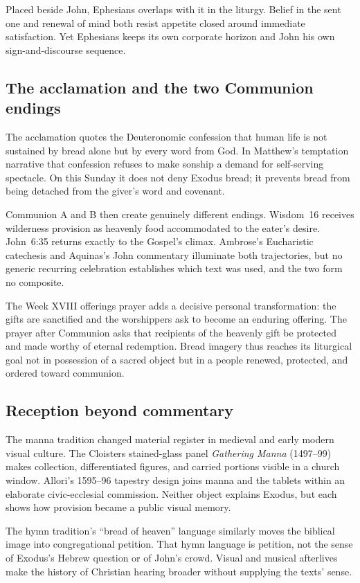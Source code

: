 Placed beside John, Ephesians overlaps with it in the liturgy. Belief in the sent one and renewal of mind both
resist appetite closed around immediate satisfaction. Yet Ephesians keeps its own corporate horizon and John his own sign-and-discourse sequence.

\subsection*{The acclamation and the two Communion endings}

The acclamation quotes the Deuteronomic confession that human life is not
sustained by bread alone but by every word from God. In Matthew's temptation
narrative that confession refuses to make sonship a demand for self-serving
spectacle. On this Sunday it does not deny Exodus bread; it prevents bread from
being detached from the giver's word and covenant.

Communion A and B then create genuinely different endings. Wisdom~16 receives
wilderness provision as heavenly food accommodated to the eater's desire.
John~6:35 returns exactly to the Gospel's climax. Ambrose's Eucharistic
catechesis and Aquinas's John commentary illuminate both trajectories, but no generic recurring celebration establishes which text was used, and the
two form no composite.

The Week XVIII offerings prayer adds a decisive personal transformation: the
gifts are sanctified and the worshippers ask to become an enduring offering.
The prayer after Communion asks that recipients of the heavenly gift be
protected and made worthy of eternal redemption. Bread imagery thus reaches
its liturgical goal not in possession of a sacred object but in a people
renewed, protected, and ordered toward communion.

\subsection*{Reception beyond commentary}

The manna tradition changed material register in medieval and early modern
visual culture. The Cloisters stained-glass panel \emph{Gathering Manna}
(1497--99) makes collection, differentiated figures, and carried portions
visible in a church window. Allori's 1595--96 tapestry design joins manna and
the tablets within an elaborate civic-ecclesial commission. Neither object
explains Exodus, but each shows how provision became a public visual memory.

The hymn tradition's ``bread of heaven'' language similarly moves the biblical
image into congregational petition. That hymn language is petition, not the sense of Exodus's Hebrew question or
of John's crowd. Visual and musical afterlives make the history of Christian
hearing broader without supplying the texts' sense.

